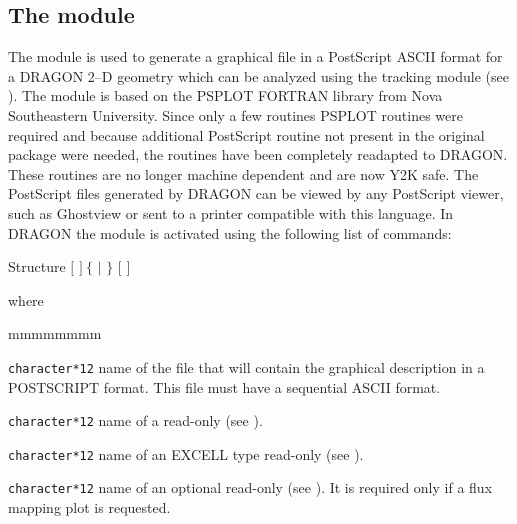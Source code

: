 \subsection{The  module}\label{sect:PSPData}

\begin{GuideUpdate}{3.04}

The  module  is used to generate a graphical file in a PostScript
ASCII format for  a DRAGON 2--D geometry which can be analyzed using the  tracking module
(see ). The module  is based on the PSPLOT FORTRAN library from Nova
Southeastern University.\cite{PSPLOT} Since only a few routines PSPLOT routines were required 
and because additional PostScript routine not present in the original package were needed, the
routines have been  completely readapted to DRAGON. These routines are no longer machine dependent
and are now Y2K safe. The PostScript files generated by DRAGON can be viewed by any PostScript
viewer, such as Ghostview\cite{GHOSTVIEW} or sent to a printer compatible with this language. In
DRAGON the
 module is activated using the following list of commands:

\begin{DataStructure}{Structure }
 \moc{:=}  $[$  $]~\{$  $|$  $\}$ $[$  $]$
\moc{::} 
\end{DataStructure}

\noindent 
where

\begin{ListeDeDescription}{mmmmmmmm}  

\item[\dusa{PSGEO}] \texttt{character*12} name of the file
that will contain the graphical description in a POSTSCRIPT format. This file must have a sequential
ASCII format.

\item[\dusa{GEONAM}] \texttt{character*12} name of a read-only  (see ).

\item[\dusa{TRKNAM}] \texttt{character*12} name of an EXCELL type read-only  (see ).

\item[\dusa{FLUNAM}] \texttt{character*12} name of an optional read-only  (see ). It is
required only if a flux mapping plot is requested.


\end{ListeDeDescription}
\end{GuideUpdate}
